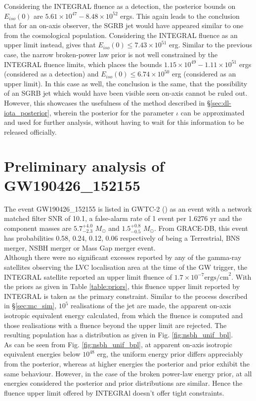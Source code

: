     Considering the INTEGRAL fluence as a detection, the posterior bounds on
    $E_{iso}(0)$ are $5.61 \times 10^{47} - 8.48 \times 10^{52}$ ergs. This again leads
    to the conclusion that for an on-axis observer, the SGRB jet would have appeared
    similar to one from the cosmological population. Considering the INTEGRAL fluence as
    an upper limit instead, gives that $E_{iso}(0) \leq 7.43 \times 10^{51}$ erg.
    Similar to the previous case, the narrow broken-power law prior is not well
    constrained by the INTEGRAL fluence limits, which places the bounds $1.15 \times
    10^{49}-1.11 \times 10^{51}$ ergs (considered as a detection) and $E_{iso}(0) \leq
    6.74 \times 10^{50}$ erg (considered as an upper limit). In this case as well, the
    conclusion is the same, that the possibility of an SGRB jet which would have been
    visible seen on-axis cannot be ruled out. However, this showcases the usefulness of
    the method described in \S \ref{sec:dl-iota_posterior}, wherein the posterior for
    the parameter $\iota$ can be approximated and used for further analysis, without
    having to wait for this information to be released officially.

\section{Preliminary analysis of GW190426\_152155}\label{sec:190426}

    The event GW190426\_152155 is listed in GWTC-2 (\cite{abbott_2020A}) as an event
    with a network matched filter SNR of 10.1, a false-alarm rate of 1 event per 1.6276
    yr and the component masses are $5.7^{+4.0}_{-2.3}$ $M_{\odot}$ and
    $1.5^{+0.8}_{-0.5}$ $M_{\odot}$. From GRACE-DB, this event has probabilities 0.58,
    0.24, 0.12, 0.06 respectively of being a Terrestrial, BNS merger, NSBH merger or
    Mass Gap merger event.\\
    Although there were no significant excesses reported by any of the gamma-ray
    satellites observing the LVC localisation area at the time of the GW trigger, the
    INTEGRAL satellite reported an upper limit fluence of $1.7 \times 10^{-7} \text{
    ergs/cm}^2$. With the priors as given in Table \ref{table:priors}, this fluence
    upper limit reported by INTEGRAL is taken as the primary constraint.  Similar to the
    process described in \S\ref{sec:mc_sim}, $10^5$ realisations of the jet are made,
    the apparent on-axis isotropic equivalent energy calculated, from which the fluence
    is computed and those realisations with a fluence beyond the upper limit are
    rejected. The resulting population has a distribution as given in Fig.
    \ref{fig:nsbh_unif_bpl}.\\
    As can be seen from Fig. \ref{fig:nsbh_unif_bpl}, at apparent on-axis isotropic
    equivalent energies below $10^{48}$ erg, the uniform energy prior differs
    appreciably from the posterior, whereas at higher energies the posterior and prior
    exhibit the same behaviour. However, in the case of the broken power-law energy
    prior, at all energies considered the posterior and prior distributions are
    similar. Hence the fluence upper limit offered by INTEGRAl doesn't offer tight
    constraints.

